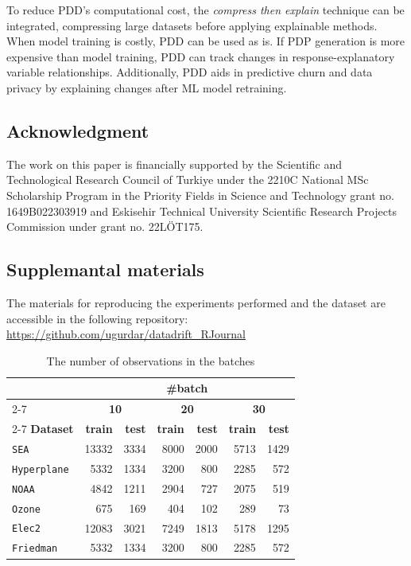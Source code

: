 To reduce PDD's computational cost, the \textit{compress then explain} technique \citep{hubert_2024} can be integrated, compressing large datasets before applying explainable methods. When model training is costly, PDD can be used as is. If PDP generation is more expensive than model training, PDD can track changes in response-explanatory variable relationships. Additionally, PDD aids in predictive churn and data privacy by explaining changes after ML model retraining.

\hypertarget{acknowledgment}{%
\subsection{Acknowledgment}\label{acknowledgment}}

The work on this paper is financially supported by the Scientific and Technological Research Council
of Turkiye under the 2210C National MSc Scholarship Program in the Priority Fields in Science and
Technology grant no. 1649B022303919 and Eskisehir Technical University Scientific Research Projects
Commission under grant no. 22LÖT175.

\hypertarget{supplemantal-materials}{%
\subsection{Supplemantal materials}\label{supplemantal-materials}}

The materials for reproducing the experiments performed and the dataset are
accessible in the following repository: \url{https://github.com/ugurdar/datadrift\_RJournal}

\begin{table}[H]
    \centering
    \small
    \caption{The number of observations in the batches}
    \label{tab:batch_number}
    \begin{tabular}{lrrrrrr}\toprule
                & \multicolumn{6}{c}{\textbf{\#batch}}\\\cmidrule(lr){2-7}
                & \multicolumn{2}{c}{\textbf{10}} & \multicolumn{2}{c}{\textbf{20}} & \multicolumn{2}{c}{\textbf{30}} \\\cmidrule(lr){2-7}
        \textbf{Dataset} & \textbf{train} & \textbf{test} & \textbf{train} & \textbf{test} & \textbf{train} & \textbf{test} \\\midrule
        \texttt{SEA} & 13332 & 3334 & 8000 & 2000 & 5713 & 1429 \\
        \texttt{Hyperplane} & 5332 & 1334 & 3200 & 800 & 2285 & 572 \\
        \texttt{NOAA} & 4842 & 1211 & 2904 & 727 & 2075 & 519 \\
        \texttt{Ozone} & 675 & 169 & 404 & 102 & 289 & 73 \\
        \texttt{Elec2} & 12083 & 3021 & 7249 & 1813 & 5178 & 1295 \\
        \texttt{Friedman} & 5332 & 1334 & 3200 & 800 & 2285 & 572 \\
        \bottomrule
    \end{tabular}
\end{table}

